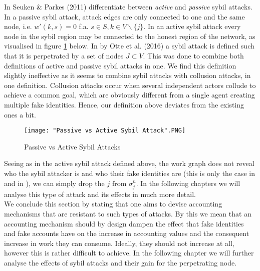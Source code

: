 \noindent{}In \cite{On the Sybil-Proofness of Accounting Mechanisms} Seuken \& Parkes (2011) differentiate between {\it active} and {\it passive} sybil attacks. In a passive sybil attack, attack edges are only connected to one and the same node, i.e. $w'(k,s)=0$ f.a. $s\in{}S,k\in{}V\backslash\lbrace{}j\rbrace$. In an active sybil attack every node in the sybil region may be connected to the honest region of the network, as visualised in figure \ref{fig:Passive vs Active Sybil Attack} below. In \cite{Sybil-resistant Trust Mechanisms in Distributed Systems} by Otte et al. (2016) a sybil attack is defined such that it is perpetrated by a set of nodes $J\subset{}V$. This was done to combine both definitions of active and passive sybil attacks in one. We find this definition slightly ineffective as it seems to combine sybil attacks with collusion attacks, in one definition. Collusion attacks occur when several independent actors collude to achieve a common goal, which are obviously different from a single agent creating multiple fake identities. Hence, our definition above deviates from the existing ones a bit.\vspace{1em}\\ 

\begin{figure}[H]
\begin{center}
\texttt{[image: "Passive vs Active Sybil Attack".PNG]}
\caption{Passive vs Active Sybil Attacks}
\label{fig:Passive vs Active Sybil Attack}
\end{center}
\end{figure}

\noindent{}Seeing as in the active sybil attack defined above, the work graph does not reveal who the sybil attacker is and who their fake identities are (this is only the case in \cite{Sybil-resistant Trust Mechanisms in Distributed Systems} and in \cite{On the Sybil-Proofness of Accounting Mechanisms}), we can simply drop the $j$ from $\sigma^n_j$. \noindent{}In the following chapters we will analyse this type of attack and its effects in much more detail. \vspace{1em}\\

\noindent{}We conclude this section by stating that one aims to devise accounting mechanisms that are resistant to such types of attacks. By this we mean that an accounting mechanism should by design dampen the effect that fake identities and fake accounts have on the increase in accounting values and the consequent increase in work they can consume. Ideally, they should not increase at all, however this is rather difficult to achieve. In the following chapter we will further analyse the effects of sybil attacks and their gain for the perpetrating node. \vspace{1em}\\
